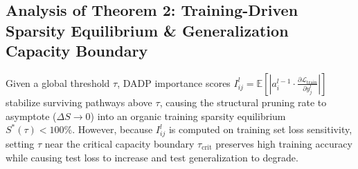 \subsection{Analysis of Theorem 2: Training-Driven Sparsity Equilibrium \& Generalization Capacity Boundary}

\begin{theorem*}
Given a global threshold $\tau$, DADP importance scores $I_{ij}^l = \mathbb{E}[|a_i^{l-1} \cdot \frac{\partial \mathcal{L}_{\text{train}}}{\partial y_j^l}|]$ stabilize surviving pathways above $\tau$, causing the structural pruning rate to asymptote ($\Delta S \to 0$) into an organic training sparsity equilibrium $S^*(\tau) < 100\%$. However, because $I_{ij}^l$ is computed on training set loss sensitivity, setting $\tau$ near the critical capacity boundary $\tau_{\text{crit}}$ preserves high training accuracy while causing test loss to increase and test generalization to degrade.
\end{theorem*}

